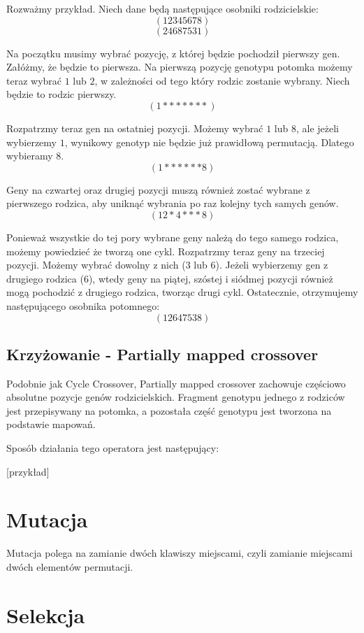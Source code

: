 \documentclass[brudnopis]{xmgr}
\begin{document}
Rozważmy przykład. Niech dane będą następujące osobniki rodzicielskie:
$$ (1 2 3 4 5 6 7 8) $$
$$ (2 4 6 8 7 5 3 1) $$

Na początku musimy wybrać pozycję, z której będzie pochodził pierwszy gen. Załóżmy, że będzie to pierwsza. Na pierwszą pozycję genotypu potomka możemy teraz wybrać $1$ lub $2$, w zależności od tego który rodzic zostanie wybrany. Niech będzie to rodzic pierwszy.
$$ (1 * * * * * * *) $$

Rozpatrzmy teraz gen na ostatniej pozycji. Możemy wybrać $1$ lub $8$, ale jeżeli wybierzemy $1$, wynikowy genotyp nie będzie już prawidłową permutacją. Dlatego wybieramy $8$.
$$ (1 * * * * * * 8) $$

Geny na czwartej oraz drugiej pozycji muszą również zostać wybrane z pierwszego rodzica, aby uniknąć wybrania po raz kolejny tych samych genów.
$$ (1 2 * 4 * * * 8) $$

Ponieważ wszystkie do tej pory wybrane geny należą do tego samego rodzica, możemy powiedzieć że tworzą one cykl. Rozpatrzmy teraz geny na trzeciej pozycji. Możemy wybrać dowolny z nich ($3$ lub $6$). Jeżeli wybierzemy gen z drugiego rodzica ($6$), wtedy geny na piątej, szóstej i siódmej pozycji również mogą pochodzić z drugiego rodzica, tworząc drugi cykl. Ostatecznie, otrzymujemy następującego osobnika potomnego:
$$ (1 2 6 4 7 5 3 8) $$


\subsection{Krzyżowanie - Partially mapped crossover}

Podobnie jak Cycle Crossover, Partially mapped crossover zachowuje częściowo absolutne pozycje genów rodzicielskich. Fragment genotypu jednego z rodziców jest przepisywany na potomka, a pozostała część genotypu jest tworzona na podstawie mapowań.

Sposób działania tego operatora jest następujący:

[przykład]


\section{Mutacja}

Mutacja polega na zamianie dwóch klawiszy miejscami, czyli zamianie miejscami dwóch elementów permutacji.


\section{Selekcja}
\end{document}
